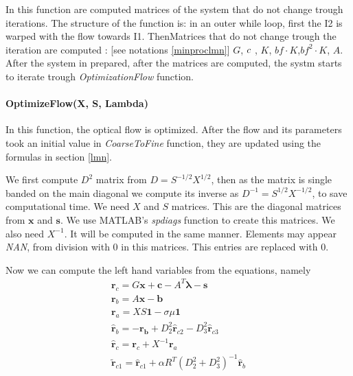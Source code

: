 \documentclass[12pt,a4paper,twoside]{report}
\begin{document}
{ In this function are computed matrices of the system that do not change trough iterations. 
 The structure of the function is: in an outer while loop, first the I2 is warped with the flow towards I1. ThenMatrices that do not change trough the iteration are computed : [see notations \ref{minproclmn}]  $G$, $\boldmath c$ , $K$, $bf \cdot K$,$bf^2 \cdot K$, $A$. 
 After the system  in prepared, after the matrices are computed, the systm starts to iterate trough \textit{OptimizationFlow} function.

\paragraph{OptimizeFlow(X, S, Lambda)}

In this function, the optical flow is optimized. After the flow  and its parameters took an initial value in \textit{CoarseToFine} function, they are updated using the formulas in section \ref{lmn}.

We first compute $D^2$ matrix from $D = S^{-1/2}X^{1/2}$, then as the matrix is single banded on the main diagonal we compute its inverse as $D^{-1} = S^{1/2}X^{-1/2}$, to save computational time. We need $X$ and $S$ matrices. This are the diagonal matrices from $\boldsymbol{x}$ and $\boldsymbol{s}$. We use MATLAB's \textit{spdiags} function to create this matrices. We also need $X^{-1}$. It will be computed in the same manner.  Elements may appear \textit{NAN}, from division with 0 in this matrices. This entries are replaced with 0.

Now we can compute the left hand variables from the equations, namely
\begin{equation}
\begin{split}
\boldsymbol{r}_c = G\boldsymbol{x} + \boldsymbol{c}-A^T\boldsymbol{\lambda} - \boldsymbol{s}\\
\boldsymbol{r}_b = A\boldsymbol{x}-\boldsymbol{b}\\
\boldsymbol{r}_a = XS\boldsymbol{1}- \sigma\mu \boldsymbol{1}\\
\hat{\boldsymbol{r}}_b =  \boldsymbol{-r_b} + D^2_2\hat{\boldsymbol{r}}_{c2} - D^2_3\hat{\boldsymbol{r}}_{c3} \\
\hat{\boldsymbol{r}}_c = \boldsymbol{r}_c + X^{-1}\boldsymbol{r}_a \\
\tilde{\boldsymbol{r}}_{c1} = \hat{\boldsymbol{r}}_{c1} + \alpha R ^T( D_2^{2} +  D_3^{2} )^{-1} \hat{\boldsymbol{r}}_{b}
\end{split}
\end{equation}

}
\end{document}

